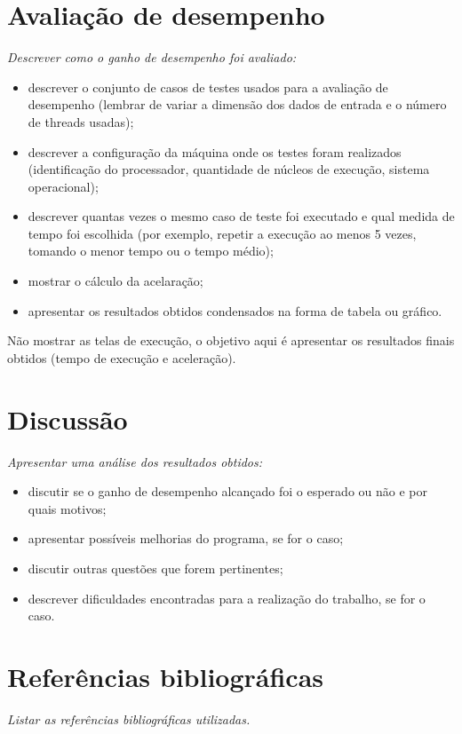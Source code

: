 \documentclass[14]{article}
\begin{document}
\section{Avaliação de desempenho}
{\em Descrever como o ganho de desempenho foi avaliado:
\begin{itemize}
\item descrever o conjunto de casos de testes usados para a avaliação de desempenho
(lembrar de variar a dimensão dos dados de entrada e o número de threads usadas);
\item descrever a configuração da máquina onde os testes foram realizados (identificação do processador,
quantidade de núcleos de execução, sistema operacional);
\item descrever quantas vezes o mesmo caso de teste foi executado e qual medida de tempo
foi escolhida (por exemplo, repetir a execução ao menos 5 vezes, tomando o menor tempo ou o tempo médio);
\item mostrar o cálculo da acelaração;
\item apresentar os resultados obtidos condensados na forma de tabela ou gráfico. 
\end{itemize}
}
{\color{red}Não mostrar as telas de execução, o objetivo aqui é apresentar os resultados
finais obtidos (tempo de execução e  aceleração).}

\section{Discussão}
{\em Apresentar uma análise dos resultados obtidos: 
\begin{itemize}
\item discutir se o ganho de desempenho alcançado foi o esperado ou não {\color{red} e por quais motivos};
\item apresentar possíveis melhorias do programa, se for o caso;
\item discutir outras questões que forem pertinentes;
\item descrever dificuldades encontradas para a realização do trabalho, se for o caso.  
\end{itemize}
}

\section{Referências bibliográficas}
{\em Listar as referências bibliográficas utilizadas.
}

%
%

\end{document}
